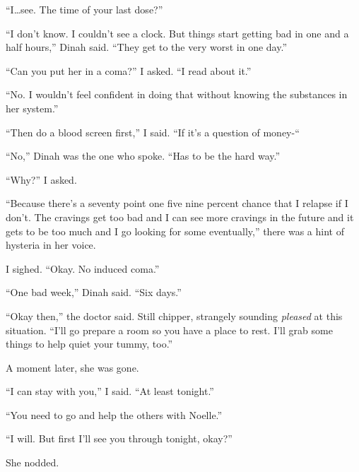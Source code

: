 ``I\ldots see.  The time of your last dose?''



``I don't know.  I couldn't see a clock.  But things start getting bad in one and a half hours,'' Dinah said.  ``They get to the very worst in one day.''



``Can you put her in a coma?'' I asked.  ``I read about it.''



``No.  I wouldn't feel confident in doing that without knowing the substances in her system.''



``Then do a blood screen first,'' I said.  ``If it's a question of money-``



``No,'' Dinah was the one who spoke.  ``Has to be the hard way.''



``Why?'' I asked.



``Because there's a seventy point one five nine percent chance that I relapse if I don't.  The cravings get too bad and I can see more cravings in the future and it gets to be too much and I go looking for some eventually,'' there was a hint of hysteria in her voice.



I sighed.  ``Okay.  No induced coma.''



``One bad week,'' Dinah said.  ``Six days.''



``Okay then,'' the doctor said.  Still chipper, strangely sounding \emph{pleased} at this situation.  ``I'll go prepare a room so you have a place to rest.  I'll grab some things to help quiet your tummy, too.''



A moment later, she was gone.



``I can stay with you,'' I said.  ``At least tonight.''



``You need to go and help the others with Noelle.''



``I will.  But first I'll see you through tonight, okay?''



She nodded.



